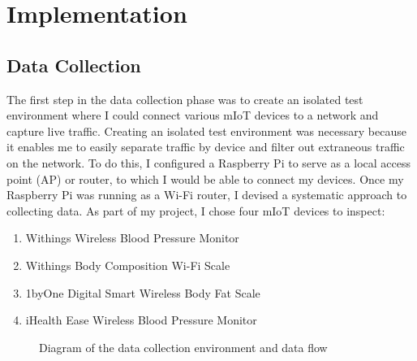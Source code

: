 \section{Implementation}

\subsection{Data Collection}

The first step in the data collection phase was to create an isolated test environment where I could connect various mIoT devices to a network and capture live traffic. Creating an isolated test environment was necessary because it enables me to easily separate traffic by device and filter out extraneous traffic on the network. To do this, I configured a Raspberry Pi to serve as a local access point (AP) or router, to which I would be able to connect my devices. Once my Raspberry Pi was running as a Wi-Fi router, I devised a systematic approach to collecting data. As part of my project, I chose four mIoT devices to inspect:

\begin{enumerate}
  \item Withings Wireless Blood Pressure Monitor
  \item Withings Body Composition Wi-Fi Scale
  \item 1byOne Digital Smart Wireless Body Fat Scale
  \item iHealth Ease Wireless Blood Pressure Monitor
\end{enumerate}

\begin{figure}
  \caption{Diagram of the data collection environment and data flow}
  \centering
\end{figure}

